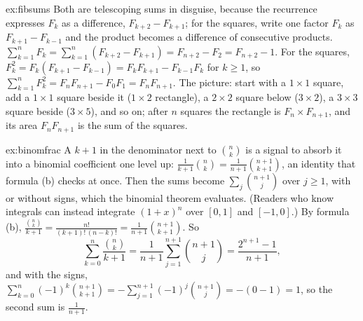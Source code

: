 \begin{solution}{ex:fibsums}
\idea Both are telescoping sums in disguise, because the recurrence expresses $F_k$ as a difference, $F_{k+2}-F_{k+1}$; for the squares, write one factor $F_k$ as $F_{k+1}-F_{k-1}$ and the product becomes a difference of consecutive products.
\writeup $\sum_{k=1}^nF_k=\sum_{k=1}^n(F_{k+2}-F_{k+1})=F_{n+2}-F_2=F_{n+2}-1$.
For the squares, $F_k^2=F_k(F_{k+1}-F_{k-1})=F_kF_{k+1}-F_{k-1}F_k$ for $k\ge1$, so $\sum_{k=1}^nF_k^2=F_nF_{n+1}-F_0F_1=F_nF_{n+1}$.
The picture: start with a $1\times1$ square, add a $1\times1$ square beside it ($1\times2$ rectangle), a $2\times2$ square below ($3\times2$), a $3\times3$ square beside ($3\times5$), and so on; after $n$ squares the rectangle is $F_n\times F_{n+1}$, and its area $F_nF_{n+1}$ is the sum of the squares.
\end{solution}

\begin{solution}{ex:binomfrac}
\idea A $k+1$ in the denominator next to $\binom nk$ is a signal to absorb it into a binomial coefficient one level up: $\frac1{k+1}\binom nk=\frac1{n+1}\binom{n+1}{k+1}$, an identity that formula (b) checks at once. Then the sums become $\sum_j\binom{n+1}j$ over $j\ge1$, with or without signs, which the binomial theorem evaluates. (Readers who know integrals can instead integrate $(1+x)^n$ over $[0,1]$ and $[-1,0]$.)
\writeup By formula (b), $\frac{\binom nk}{k+1}=\frac{n!}{(k+1)!\,(n-k)!}=\frac1{n+1}\binom{n+1}{k+1}$. So
\[
\sum_{k=0}^n\frac{\binom nk}{k+1}=\frac1{n+1}\sum_{j=1}^{n+1}\binom{n+1}j=\frac{2^{n+1}-1}{n+1},
\]
and with the signs, $\sum_{k=0}^n(-1)^k\binom{n+1}{k+1}=-\sum_{j=1}^{n+1}(-1)^j\binom{n+1}j=-(0-1)=1$, so the second sum is $\frac1{n+1}$.
\end{solution}

